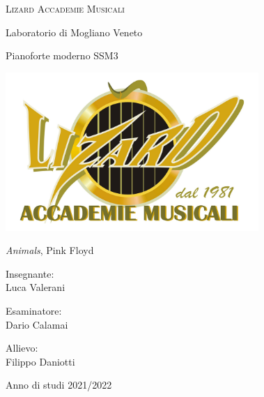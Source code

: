 \documentclass[class=book, crop=false, oneside]{standalone}
\begin{document}
    \begin{titlepage}
        \begin{center}
                
            \Huge
            \textsc{Lizard Accademie Musicali}
            
            \vspace{0.5cm}
            \LARGE
            Laboratorio di Mogliano Veneto
            
            \vspace{0.5cm}
            \large
            Pianoforte moderno SSM3
            
            \vspace{1cm}
            
            \includegraphics[width=0.72\textwidth,keepaspectratio]{logo-lizard1.jpg}   
            
            
            
            \vspace{0.5cm}
            
            \Huge{\emph{Animals}, Pink Floyd}
            
            \vspace{0.5cm}
            
            
        \end{center}  
        
        \raggedright
        
        \Large
        Insegnante:
        \vspace{0.125cm}\\
        \large
        Luca Valerani

        \vspace{0.2cm}

        \Large
        Esaminatore:
        \vspace{0.125cm}\\
        \large
        Dario Calamai
        
        \raggedleft
        
        \Large
        Allievo:
        \vspace{0.125cm}\\
        \large
        Filippo Daniotti
        
        
        
        \begin{center}
            \vspace{1cm}
            Anno di studi 2021/2022 
        \end{center}
        
    \end{titlepage}
\end{document}
